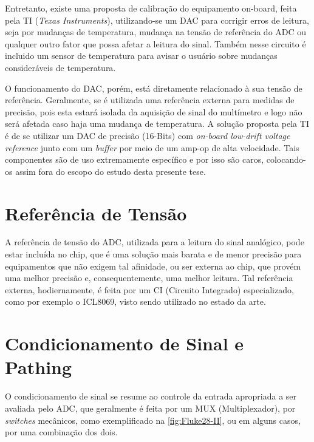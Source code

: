 Entretanto, existe uma proposta de calibração do equipamento on-board, feita pela \gls{TI} (\textit{Texas Instruments}), utilizando-se um \gls{DAC} para corrigir erros de leitura, seja por mudanças de temperatura, mudança na tensão de referência do \gls{ADC} ou qualquer outro fator que possa afetar a leitura do sinal. Também nesse circuito é incluido um sensor de temperatura para avisar o usuário sobre mudanças consideráveis de temperatura.

O funcionamento do \gls{DAC}, porém, está diretamente relacionado à sua tensão de referência. Geralmente, se é utilizada uma referência externa para medidas de precisão, pois esta estará isolada da aquisição de sinal do multímetro e logo não será afetada caso haja uma mudança de temperatura. A solução proposta pela \gls{TI} é de se utilizar um \gls{DAC} de precisão (16-Bits) com \textit{on-board low-drift voltage reference} junto com um \textit{buffer} por meio de um \gls{amp-op} de alta velocidade. Tais componentes são de uso extremamente específico e por isso são caros, colocando-os assim fora do escopo do estudo desta presente tese. %

\section{Referência de Tensão}\label{sec:VoltageReference}

A referência de tensão do ADC, utilizada para a leitura do sinal analógico, pode estar incluída no chip, que é uma solução mais barata e de menor precisão para equipamentos que não exigem tal afinidade, ou ser externa ao chip, que provém uma melhor precisão e, consequentemente, uma melhor leitura. Tal referência externa, hodiernamente, é feita por um \gls{CI} (Circuito Integrado) especializado, como por exemplo o ICL8069, visto sendo utilizado no estado da arte. %


\section{Condicionamento de Sinal e Pathing}\label{sec:signalConditioningandPathing}

O condicionamento de sinal se resume ao controle da entrada apropriada a ser avaliada pelo ADC, que geralmente é feita por um \gls{MUX} (Multiplexador), por \textit{switches} mecânicos, como exemplificado na \autoref{fig:Fluke28-II}, ou em alguns casos, por uma combinação dos dois.  

